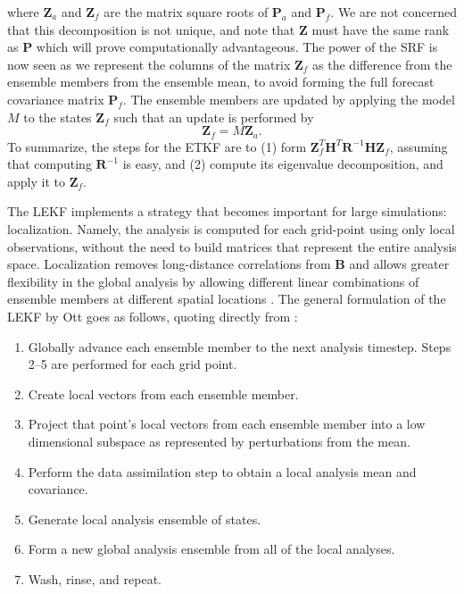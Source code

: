 \documentclass[pre,twocolumn,twoside,byrevtex,superscriptaddress]{revtex4}
\newcommand{\mbR}{\mathbf{R}}
\newcommand{\mbH}{\mathbf{H}}
\newcommand{\mbP}{\mathbf{P}}
\newcommand{\mbZ}{\mathbf{Z}}
\begin{document}
where $\mbZ_a$ and $\mbZ_f$ are the matrix square roots of $\mbP_a$ and $\mbP_f$.
We are not concerned that this decomposition is not unique, and note that $\mbZ$ must have the same rank as $\mbP$ which will prove computationally advantageous.
The power of the SRF is now seen as we represent the columns of the matrix $\mbZ_f$ as the difference from the ensemble members from the ensemble mean, to avoid forming the full forecast covariance matrix $\mbP_f$.
The ensemble members are updated by applying the model $M$ to the states $\mbZ_f$ such that an update is performed by
\begin{equation} \mbZ_f = M \mbZ_a .\end{equation}
To summarize, the steps for the ETKF are to (1) form $\mbZ_f^T\mbH^T\mbR^{-1}\mbH\mbZ_f$, assuming that computing $\mathbf{R}^{-1}$ is easy, and (2) compute its eigenvalue decomposition, and apply it to $\mbZ_f$.

The LEKF implements a strategy that becomes important for large simulations: localization.
Namely, the analysis is computed for each grid-point using only local observations, without the need to build matrices that represent the entire analysis space.
Localization removes long-distance correlations from $\mathbf{B}$ and allows greater flexibility in the global analysis by allowing different linear combinations of ensemble members at different spatial locations \cite{kalnay2007a}.
The general formulation of the LEKF by Ott goes as follows, quoting directly from \cite{ott2004local}:
\begin{enumerate}
\item Globally advance each ensemble member to the next analysis timestep. Steps 2--5 are performed for each grid point.
\item Create local vectors from each ensemble member.
\item Project that point's local vectors from each ensemble member into a low dimensional subspace as represented by perturbations from the mean.
\item Perform the data assimilation step to obtain a local analysis mean and covariance.
\item Generate local analysis ensemble of states.
\item Form a new global analysis ensemble from all of the local analyses.
\item Wash, rinse, and repeat.
\end{enumerate}
\end{document}
